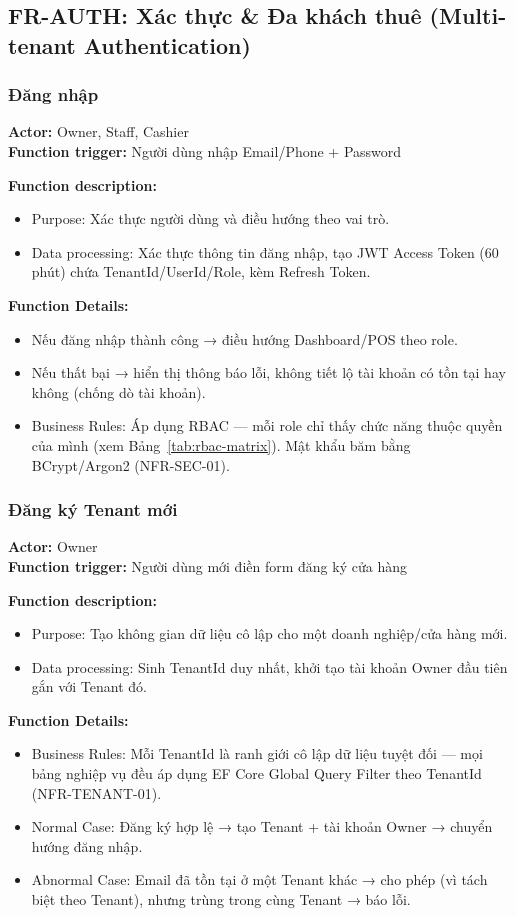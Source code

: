 \subsection{FR-AUTH: Xác thực \& Đa khách thuê (Multi-tenant Authentication)}

\subsubsection{Đăng nhập}
\textbf{Actor:} Owner, Staff, Cashier \\
\textbf{Function trigger:} Người dùng nhập Email/Phone + Password

\textbf{Function description:}
\begin{itemize}
    \item Purpose: Xác thực người dùng và điều hướng theo vai trò.
    \item Data processing: Xác thực thông tin đăng nhập, tạo JWT Access Token (60 phút) chứa TenantId/UserId/Role, kèm Refresh Token.
\end{itemize}

\textbf{Function Details:}
\begin{itemize}
    \item Nếu đăng nhập thành công → điều hướng Dashboard/POS theo role.
    \item Nếu thất bại → hiển thị thông báo lỗi, không tiết lộ tài khoản có tồn tại hay không (chống dò tài khoản).
    \item Business Rules: Áp dụng RBAC — mỗi role chỉ thấy chức năng thuộc quyền của mình (xem Bảng~\ref{tab:rbac-matrix}). Mật khẩu băm bằng BCrypt/Argon2 (NFR-SEC-01).
\end{itemize}

\subsubsection{Đăng ký Tenant mới}
\textbf{Actor:} Owner \\
\textbf{Function trigger:} Người dùng mới điền form đăng ký cửa hàng

\textbf{Function description:}
\begin{itemize}
    \item Purpose: Tạo không gian dữ liệu cô lập cho một doanh nghiệp/cửa hàng mới.
    \item Data processing: Sinh TenantId duy nhất, khởi tạo tài khoản Owner đầu tiên gắn với Tenant đó.
\end{itemize}

\textbf{Function Details:}
\begin{itemize}
    \item Business Rules: Mỗi TenantId là ranh giới cô lập dữ liệu tuyệt đối — mọi bảng nghiệp vụ đều áp dụng EF Core Global Query Filter theo TenantId (NFR-TENANT-01).
    \item Normal Case: Đăng ký hợp lệ → tạo Tenant + tài khoản Owner → chuyển hướng đăng nhập.
    \item Abnormal Case: Email đã tồn tại ở một Tenant khác → cho phép (vì tách biệt theo Tenant), nhưng trùng trong cùng Tenant → báo lỗi.
\end{itemize}


